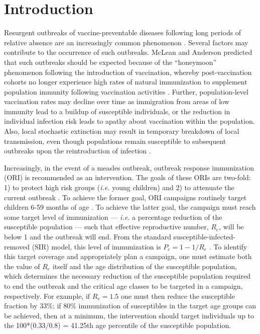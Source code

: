 \section{Introduction}\label{introduction}

Resurgent outbreaks of vaccine-preventable diseases following long periods of relative absence are an increasingly common phenomenon \cite{Hersh_1991, Cherry_2012, Celentano_2005, Shibeshi_2014}. Several factors may contribute to the occurrence of such outbreaks. McLean and Anderson \cite{McLean_1988} predicted that such outbreaks should be expected because of the ``honeymoon'' phenomenon following the introduction of vaccination, whereby post-vaccination cohorts no longer experience high rates of natural immunization to supplement population immunity following vaccination activities \cite{Jansen_2003}. Further, population-level vaccination rates may decline over time as immigration from areas of low immunity lead to a buildup of susceptible individuals, or the reduction in individual infection risk \cite{Omer_2009} leads to apathy about vaccination within the population. Also, local stochastic extinction may result in temporary breakdown of local transmission, even though populations remain susceptible to subsequent outbreaks upon the reintroduction of infection \cite{Ferrari_2008}.

Increasingly, in the event of a measles outbreak, outbreak response immunization (ORI) is recommended as an intervention. The goals of these ORIs are two-fold: 1) to protect high risk groups (\emph{i.e.} young children) and 2) to attenuate the current outbreak \cite{Cairns_2011,Grais_2011}. To achieve the former goal, ORI campaigns routinely target children 6-59 months of age \cite{Cairns_2011}. To achieve the latter goal, the campaign must reach some target level of immunization --- \emph{i.e.} a percentage reduction of the susceptible population --- such that effective reproductive number, \(R_e\), will be below 1 and the outbreak will end. From the standard susceptible-infected-removed (SIR) model, this level of immunization is \(P_c = 1-1/R_e\) \cite{Anderson_1981}. To identify this target coverage and appropriately plan a campaign, one must estimate both the value of \(R_e\) itself and the age distribution of the susceptible population, which determines the necessary reduction of the susceptible population required to end the outbreak and the critical age classes to be targeted in a campaign, respectively. For example, if \(R_e=1.5\) one must then reduce the susceptible fraction by 33\%; if 80\% immunization of susceptibles in the target age groups can be achieved, then at a minimum, the intervention should target individuals up to the 100*(0.33/0.8) = 41.25th age percentile of the susceptible population.

